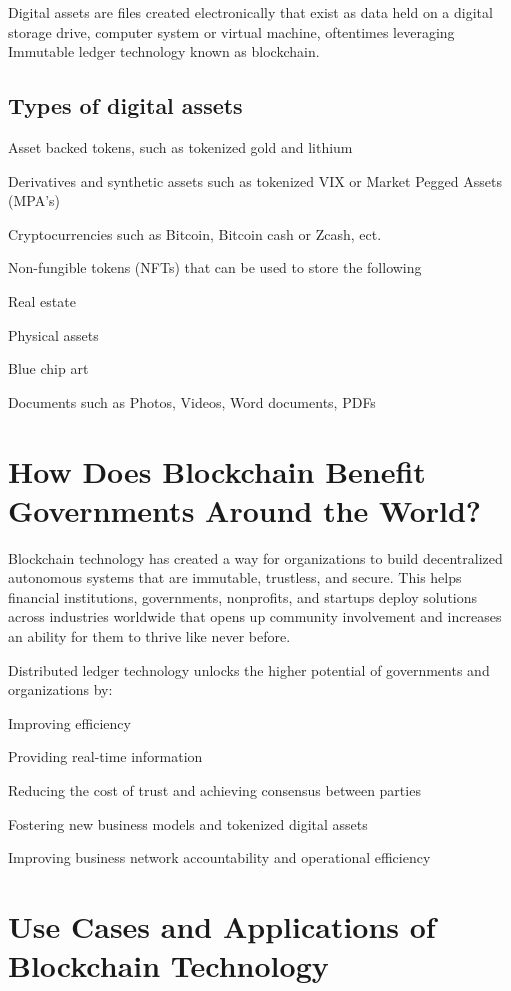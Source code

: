 \documentclass[11pt]{article}
\begin{document}
Digital assets are files created electronically that exist as data held on a digital storage drive, computer system or virtual machine, oftentimes leveraging Immutable ledger technology known as blockchain.


\subsection{Types of digital assets}

Asset backed tokens, such as tokenized gold and lithium


Derivatives and synthetic assets such as tokenized VIX or Market Pegged Assets (MPA's)


Cryptocurrencies such as Bitcoin, Bitcoin cash or Zcash, ect.


Non-fungible tokens (NFTs) that can be used to store the following


Real estate


Physical assets


Blue chip art


Documents such as Photos, Videos, Word documents, PDFs


\section{How Does Blockchain Benefit Governments Around the World?}

Blockchain technology has created a way for organizations to build decentralized autonomous systems that are immutable, trustless, and secure. This helps financial institutions, governments, nonprofits, and startups deploy solutions across industries worldwide that opens up community involvement and increases an ability for them to thrive like never before.


Distributed ledger technology unlocks the higher potential of governments and organizations by:


Improving efficiency


Providing real-time information


Reducing the cost of trust and achieving consensus between parties


Fostering new business models and tokenized digital assets


Improving business network accountability and operational efficiency


\section{Use Cases and Applications of Blockchain Technology}
\end{document}
